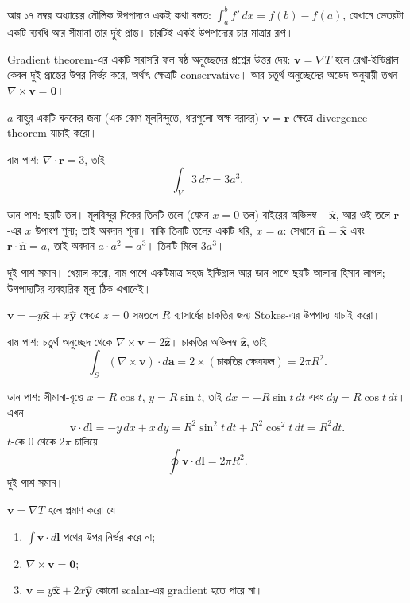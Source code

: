 \documentclass[11pt]{article}
\begin{document}
আর ১৭ নম্বর অধ্যায়ের মৌলিক উপপাদ্যও একই কথা বলত:
$\int_{a}^{b}f'\,dx = f(b)-f(a)$, যেখানে ভেতরটা একটি ব্যবধি আর সীমানা তার
দুই প্রান্ত। চারটিই একই উপপাদ্যের চার মাত্রার রূপ।

Gradient theorem-এর একটি সরাসরি ফল ষষ্ঠ অনুচ্ছেদের প্রশ্নের উত্তর দেয়:
$\mathbf{v} = \nabla T$ হলে রেখা-ইন্টিগ্রাল কেবল দুই প্রান্তের উপর নির্ভর
করে, অর্থাৎ ক্ষেত্রটি conservative। আর চতুর্থ অনুচ্ছেদের অভেদ অনুযায়ী তখন
$\nabla\times\mathbf{v} = \mathbf{0}$।

\begin{example}
$a$ বাহুর একটি ঘনকের জন্য (এক কোণ মূলবিন্দুতে, ধারগুলো অক্ষ বরাবর)
$\mathbf{v} = \mathbf{r}$ ক্ষেত্রে divergence theorem যাচাই করো।
\end{example}

\begin{solbox}
বাম পাশ: $\nabla\cdot\mathbf{r} = 3$, তাই
\[
  \int_{V}3\,d\tau = 3a^{3} .
\]

ডান পাশ: ছয়টি তল। মূলবিন্দুর দিকের তিনটি তলে (যেমন $x=0$ তল) বাইরের অভিলম্ব
$-\hat{\mathbf{x}}$, আর ওই তলে $\mathbf{r}$-এর $x$ উপাংশ শূন্য; তাই অবদান
শূন্য। বাকি তিনটি তলের একটি ধরি, $x = a$: সেখানে
$\hat{\mathbf{n}} = \hat{\mathbf{x}}$ এবং
$\mathbf{r}\cdot\hat{\mathbf{n}} = a$, তাই অবদান $a \cdot a^{2} = a^{3}$।
তিনটি মিলে $3a^{3}$।

দুই পাশ সমান। খেয়াল করো, বাম পাশে একটিমাত্র সহজ ইন্টিগ্রাল আর ডান পাশে ছয়টি
আলাদা হিসাব লাগল; উপপাদ্যটির ব্যবহারিক মূল্য ঠিক এখানেই।
\end{solbox}

 $\mathbf{v} = -y\hat{\mathbf{x}} + x\hat{\mathbf{y}}$ ক্ষেত্রে
$z=0$ সমতলে $R$ ব্যাসার্ধের চাকতির জন্য Stokes-এর উপপাদ্য যাচাই করো।

\begin{sol}
বাম পাশ: চতুর্থ অনুচ্ছেদ থেকে $\nabla\times\mathbf{v} = 2\hat{\mathbf{z}}$।
চাকতির অভিলম্ব $\hat{\mathbf{z}}$, তাই
\[
  \int_{S}\left( \nabla\times\mathbf{v} \right)\cdot d\mathbf{a}
  = 2 \times (\text{চাকতির ক্ষেত্রফল}) = 2\pi R^{2} .
\]

ডান পাশ: সীমানা-বৃত্তে $x = R\cos t$, $y = R\sin t$, তাই
$dx = -R\sin t\,dt$ এবং $dy = R\cos t\,dt$। এখন
\[
  \mathbf{v}\cdot d\mathbf{l} = -y\,dx + x\,dy
  = R^{2}\sin^{2}t\,dt + R^{2}\cos^{2}t\,dt = R^{2}dt .
\]
$t$-কে $0$ থেকে $2\pi$ চালিয়ে
\[
  \oint\mathbf{v}\cdot d\mathbf{l} = 2\pi R^{2} .
\]
দুই পাশ সমান।
\end{sol}

 $\mathbf{v} = \nabla T$ হলে প্রমাণ করো যে
\begin{enumerate}
  \item $\int\mathbf{v}\cdot d\mathbf{l}$ পথের উপর নির্ভর করে না;
  \item $\nabla\times\mathbf{v} = \mathbf{0}$;
  \item $\mathbf{v} = y\hat{\mathbf{x}} + 2x\hat{\mathbf{y}}$ কোনো
        scalar-এর gradient হতে পারে না।
\end{enumerate}
\end{document}
